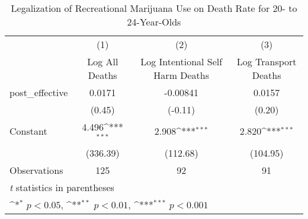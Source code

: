 \begin{table}[htbp]\centering
\def\sym#1{\ifmmode^{#1}\else\(^{#1}\)\fi}
\caption{Legalization of Recreational Marijuana Use on Death Rate for 20- to 24-Year-Olds}
\begin{tabular}{l*{3}{c}}
\hline\hline
                    &\multicolumn{1}{c}{(1)}&\multicolumn{1}{c}{(2)}&\multicolumn{1}{c}{(3)}\\
                    &\multicolumn{1}{c}{Log All Deaths}&\multicolumn{1}{c}{Log Intentional Self Harm Deaths}&\multicolumn{1}{c}{Log Transport Deaths}\\
\hline
post\_effective      &      0.0171         &    -0.00841         &      0.0157         \\
                    &      (0.45)         &     (-0.11)         &      (0.20)         \\
[1em]
Constant            &       4.496\sym{***}&       2.908\sym{***}&       2.820\sym{***}\\
                    &    (336.39)         &    (112.68)         &    (104.95)         \\
\hline
Observations        &         125         &          92         &          91         \\
\hline\hline
\multicolumn{4}{l}{\footnotesize \textit{t} statistics in parentheses}\\
\multicolumn{4}{l}{\footnotesize \sym{*} \(p<0.05\), \sym{**} \(p<0.01\), \sym{***} \(p<0.001\)}\\
\end{tabular}
\end{table}
